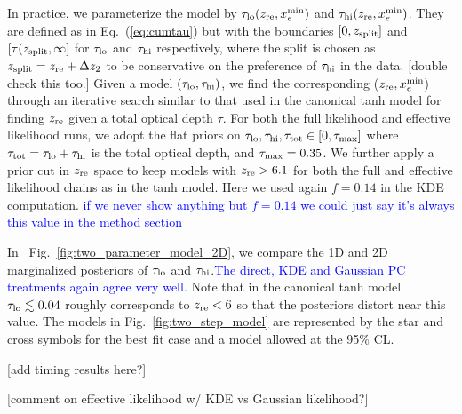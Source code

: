 \documentclass[prd,twocolumn,amsmath,amssymb,floatfix,superscriptaddress,nofootinbib]{revtex4-1}
\newcommand{\refeq}[1]{Eq.~(\ref{eq:#1})}
\newcommand{\reffig}[1]{Fig.~\ref{fig:#1}}
\newcommand{\zre}{z_{\rm re}}
\newcommand{\xemin}{x_e^{\rm min}}
\newcommand{\tauhi}{\tau_{\rm hi}}
\newcommand{\taulo}{\tau_{\rm lo}}
\newcommand{\wh}[1]{\textcolor{blue}{#1}}
\begin{document}
In practice, we parameterize the model by $\taulo(\zre, \xemin)$ and $\tauhi(\zre, \xemin)$.  They are defined as in \refeq{cumtau} but with the boundaries $[0, z_{\rm split}]$ and $[\tau(z_{\rm split}, \infty]$ for $\taulo$ and $\tauhi$ respectively, where the split is chosen as $z_{\rm split} = \zre + \Delta z_2$ to be conservative on the preference of $\tauhi$ in the data. [double check this too.]
Given a model $(\taulo, \tauhi)$, we find the corresponding ($\zre, \xemin$) through an iterative search similar to that used in the canonical tanh model for finding $\zre$ given a total optical depth $\tau$. 
For both the full likelihood and effective likelihood runs, we adopt the flat priors on $\taulo, \tauhi, \tau_{\rm tot} \in [0, \tau_{\rm max}]$ where  $\tau_{\rm tot} = \taulo + \tauhi$ is the total optical depth, and $\tau_{\rm max} = 0.35$. 
We further apply a prior cut in $\zre$ space to keep models with $\zre > 6.1$ for both the full and effective likelihood chains as in the tanh model. Here we used again $f = 0.14$ in the KDE computation. \wh{if we never show anything but $f=0.14$ we could just say it's always this value in the method section}

In ~\reffig{two_parameter_model_2D}, we compare the 1D and 2D marginalized posteriors of $\taulo$ and $\tauhi$.\wh{The direct, KDE and Gaussian PC treatments again agree very well.} 
Note that in the canonical tanh model $\taulo \lesssim 0.04$ roughly corresponds to $\zre < 6$ so that the posteriors distort near this value.
The models in Fig.~\ref{fig:two_step_model} are represented by the star and cross symbols for the best fit case and a model allowed at the 95\% CL.

%

[add timing results here?] 

[comment on effective likelihood w/ KDE vs Gaussian likelihood?]
\end{document}
